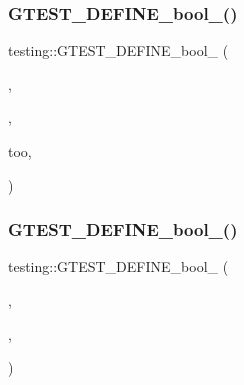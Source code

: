 \mbox{\label{namespacetesting_ad72f215c805a46fba44cb09d717b01ef}} 
\subsubsection{\texorpdfstring{G\+T\+E\+S\+T\+\_\+\+D\+E\+F\+I\+N\+E\+\_\+bool\+\_\+()}{GTEST\_DEFINE\_bool\_()}\hspace{0.1cm}{\footnotesize\ttfamily [2/9]}}
{\footnotesize\ttfamily testing\+::\+G\+T\+E\+S\+T\+\_\+\+D\+E\+F\+I\+N\+E\+\_\+bool\+\_\+ (\begin{DoxyParamCaption}\item[{also\+\_\+run\+\_\+disabled\+\_\+tests}]{,  }\item[{\hyperlink{namespacetesting_1_1internal_a67132cdce23fb71b6c38ee34ef81eb4c}{internal\+::\+Bool\+From\+G\+Test\+Env}(\char`\"{}also\+\_\+run\+\_\+disabled\+\_\+tests\char`\"{}, false)}]{,  }\item[{\char`\"{}Run disabled tests}]{too,  }\item[{in addition to the tests normally being run.\char`\"{}}]{ }\end{DoxyParamCaption})}

\mbox{\label{namespacetesting_a5ab9e9cc2ee1addddfb2f4b43dd4e402}} 
\subsubsection{\texorpdfstring{G\+T\+E\+S\+T\+\_\+\+D\+E\+F\+I\+N\+E\+\_\+bool\+\_\+()}{GTEST\_DEFINE\_bool\_()}\hspace{0.1cm}{\footnotesize\ttfamily [3/9]}}
{\footnotesize\ttfamily testing\+::\+G\+T\+E\+S\+T\+\_\+\+D\+E\+F\+I\+N\+E\+\_\+bool\+\_\+ (\begin{DoxyParamCaption}\item[{break\+\_\+on\+\_\+failure}]{,  }\item[{\hyperlink{namespacetesting_1_1internal_a67132cdce23fb71b6c38ee34ef81eb4c}{internal\+::\+Bool\+From\+G\+Test\+Env}(\char`\"{}break\+\_\+on\+\_\+failure\char`\"{}, false)}]{,  }\item[{\char`\"{}True iff a failed assertion should be a debugger break-\/point.\char`\"{}}]{ }\end{DoxyParamCaption})}


